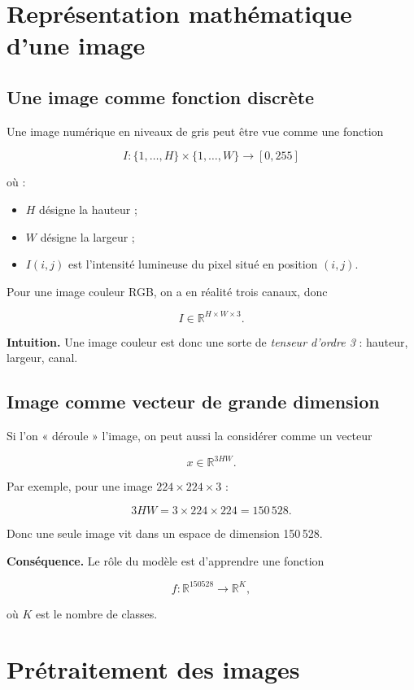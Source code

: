 ﻿\documentclass[11pt,a4paper]{article}
\begin{document}
\section{Représentation mathématique d'une image}

\subsection{Une image comme fonction discrète}

Une image numérique en niveaux de gris peut être vue comme une fonction

\[
I : \{1,\dots,H\} \times \{1,\dots,W\} \to [0,255]
\]

où :
\begin{itemize}
    \item $H$ désigne la hauteur ;
    \item $W$ désigne la largeur ;
    \item $I(i,j)$ est l’intensité lumineuse du pixel situé en position $(i,j)$.
\end{itemize}

Pour une image couleur RGB, on a en réalité trois canaux, donc

\[
I \in \mathbb{R}^{H \times W \times 3}.
\]

\textbf{Intuition.}  
Une image couleur est donc une sorte de \emph{tenseur d’ordre 3} :
hauteur, largeur, canal.

\subsection{Image comme vecteur de grande dimension}

Si l’on « déroule » l’image, on peut aussi la considérer comme un vecteur

\[
x \in \mathbb{R}^{3HW}.
\]

Par exemple, pour une image $224 \times 224 \times 3$ :

\[
3HW = 3 \times 224 \times 224 = 150\,528.
\]

Donc une seule image vit dans un espace de dimension 150\,528.

\textbf{Conséquence.}  
Le rôle du modèle est d’apprendre une fonction

\[
f : \mathbb{R}^{150528} \to \mathbb{R}^K,
\]

où $K$ est le nombre de classes.

\section{Prétraitement des images}
\end{document}
